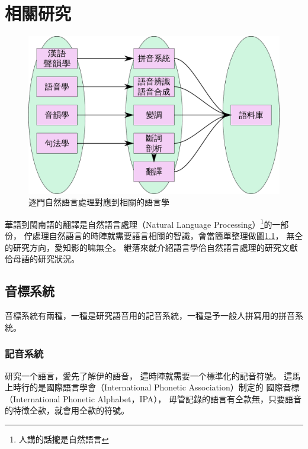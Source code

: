 \chapter{相關研究}
\label{章：相關研究}

\begin{figure}
\centerline{\includegraphics[keepaspectratio,width=40em]{圖/相關研究智識}}
\caption{逐門自然語言處理對應到相關的語言學}
\label{圖：相關研究智識}
\end{figure}


華語到閩南語的翻譯是自然語言處理（Natural Language Processing）\footnote{人講的話攏是自然語言}的一部份，
佇處理自然語言的時陣就需要語言相關的智識，會當簡單整理做圖\ref{圖：相關研究智識}，
無仝的研究方向，愛知影的嘛無仝。
紲落來就介紹語言學佮自然語言處理的研究文獻佮母語的研究狀況。

\section{音標系統}
\label{節：音標系統}
音標系統有兩種，一種是研究語音用的記音系統，一種是予一般人拼寫用的拼音系統。

\subsection{記音系統}
\label{小節：記音系統}
研究一个語言，愛先了解伊的語音，
這時陣就需要一个標準化的記音符號。
這馬上時行的是國際語言學會（International Phonetic Association）制定的
國際音標（International Phonetic Alphabet，IPA）\cite{WIKI國際音標}，
毋管記錄的語言有仝款無，只要語音的特徵仝款，就會用仝款的符號。

